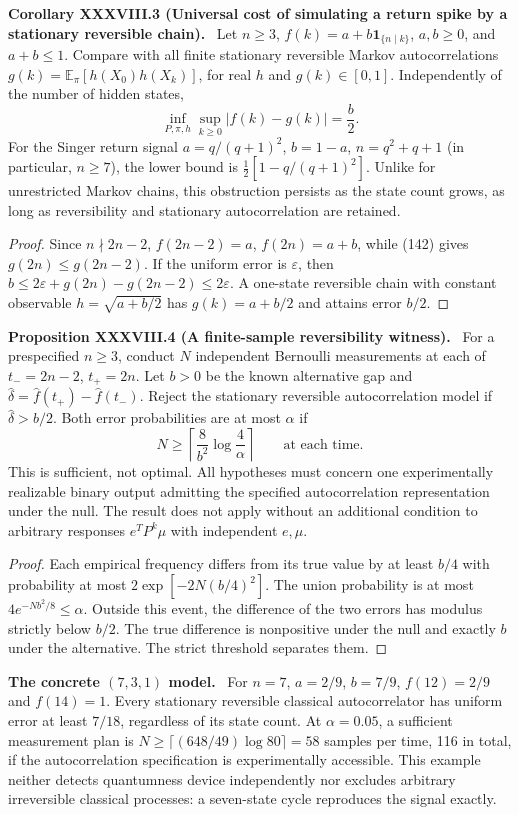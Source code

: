 \documentclass[11pt,a4paper,oneside]{book}
\newcommand{\one}{\mathbf 1}\newcommand{\ii}{\mathrm i}\newcommand{\dd}{\mathrm d}
\newcommand{\statement}[3]{\par\medskip\noindent\textbf{#1 #2 (#3).}\ }
\newcommand{\note}[1]{\par\medskip\noindent\textbf{#1}\ }
\begin{document}
\statement{Corollary}{XXXVIII.3}{Universal cost of simulating a return spike by a stationary reversible chain}
Let $n\ge3$, $f(k)=a+b\one_{\{n\mid k\}}$, $a,b\ge0$, and $a+b\le1$. Compare with all finite stationary reversible Markov autocorrelations $g(k)=\mathbb E_\pi[h(X_0)h(X_k)]$, for real $h$ and $g(k)\in[0,1]$. Independently of the number of hidden states,
\begin{equation}\inf_{P,\pi,h}\sup_{k\ge0}|f(k)-g(k)|=\frac b2.\tag{144}\end{equation}
For the Singer return signal $a=q/(q+1)^2$, $b=1-a$, $n=q^2+q+1$ (in particular, $n\ge7$), the lower bound is $\tfrac12[1-q/(q+1)^2]$. Unlike for unrestricted Markov chains, this obstruction persists as the state count grows, as long as reversibility and stationary autocorrelation are retained.
\begin{proof}
Since $n\nmid2n-2$, $f(2n-2)=a$, $f(2n)=a+b$, while (142) gives $g(2n)\le g(2n-2)$. If the uniform error is $\varepsilon$, then $b\le2\varepsilon+g(2n)-g(2n-2)\le2\varepsilon$. A one-state reversible chain with constant observable $h=\sqrt{a+b/2}$ has $g(k)=a+b/2$ and attains error $b/2$.
\end{proof}
\statement{Proposition}{XXXVIII.4}{A finite-sample reversibility witness}
For a prespecified $n\ge3$, conduct $N$ independent Bernoulli measurements at each of $t_-=2n-2$, $t_+=2n$. Let $b>0$ be the known alternative gap and $\widehat\delta=\widehat f(t_+)-\widehat f(t_-)$. Reject the stationary reversible autocorrelation model if $\widehat\delta>b/2$. Both error probabilities are at most $\alpha$ if
\begin{equation}N\ge\left\lceil\frac8{b^2}\log\frac4\alpha\right\rceil\qquad\text{at each time}.\tag{145}\end{equation}
This is sufficient, not optimal. All hypotheses must concern one experimentally realizable binary output admitting the specified autocorrelation representation under the null. The result does not apply without an additional condition to arbitrary responses $e^TP^k\mu$ with independent $e,\mu$.
\begin{proof}
Each empirical frequency differs from its true value by at least $b/4$ with probability at most $2\exp[-2N(b/4)^2]$. The union probability is at most $4e^{-Nb^2/8}\le\alpha$. Outside this event, the difference of the two errors has modulus strictly below $b/2$. The true difference is nonpositive under the null and exactly $b$ under the alternative. The strict threshold separates them.
\end{proof}
\note{The concrete $(7,3,1)$ model.} For $n=7$, $a=2/9$, $b=7/9$, $f(12)=2/9$ and $f(14)=1$. Every stationary reversible classical autocorrelator has uniform error at least $7/18$, regardless of its state count. At $\alpha=0.05$, a sufficient measurement plan is $N\ge\lceil(648/49)\log80\rceil=58$ samples per time, 116 in total, if the autocorrelation specification is experimentally accessible. This example neither detects quantumness device independently nor excludes arbitrary irreversible classical processes: a seven-state cycle reproduces the signal exactly.
\end{document}

